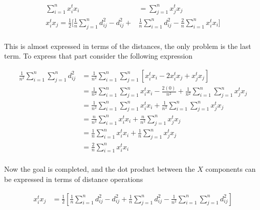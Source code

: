 \documentclass[12pt,journal]{IEEEtran}
\begin{document}
    \begin{equation*}
        \begin{aligned}
            \sum_{i=1}^n x_i^t x_i &= \sum_{j=1}^n x_j^t x_j\\
            x_i^t x_j =
            \frac{1}{2} \Bigg [ \frac{1}{n} \sum_{j=1}^n d_{ij}^2 - d_{ij}^2 + &\frac{1}{n} \sum_{i=1}^n d_{ij}^2 - \frac{2}{n} \sum_{i=1}^n x_i^t x_i \Bigg ]\\
        \end{aligned}
    \end{equation*}

    This is almost expressed in terms of the distances, the only problem is the
    last term. To express that part consider the following expression

    \begin{equation*}
        \begin{aligned}
            \frac{1}{n^2}\sum_{i=1}^n \sum_{j=1}^n d_{ij}^2
            &=
            \frac{1}{n^2}\sum_{i=1}^n \sum_{j=1}^n [x_i^t x_i - 2 x_i^t x_j + x_j^t x_j]\\
            &=
            \frac{1}{n^2}\sum_{i=1}^n \sum_{j=1}^n x_i^t x_i - \frac{2(0)}{n^2} +  \frac{1}{n^2}\sum_{i=1}^n \sum_{j=1}^nx_j^t x_j\\
            &=
            \frac{1}{n^2}\sum_{i=1}^n \sum_{j=1}^n x_i^t x_i +  \frac{1}{n^2}\sum_{i=1}^n \sum_{j=1}^nx_j^t x_j\\
            &=
            \frac{n}{n^2}\sum_{i=1}^n x_i^t x_i +  \frac{n}{n^2}\sum_{j=1}^n x_j^t x_j\\
            &=
            \frac{1}{n}\sum_{i=1}^n x_i^t x_i +  \frac{1}{n}\sum_{j=1}^n x_j^t x_j\\
            &=
            \frac{2}{n}\sum_{i=1}^n x_i^t x_i\\
        \end{aligned}
    \end{equation*}

    Now the goal is completed, and the dot product between the $X$ components
    can be expressed in terms of distance operations

    \begin{equation*}
        \begin{aligned}
            x_i^t x_j
            &=
            \frac{1}{2} \left[ \frac{1}{n} \sum_{i=1}^n d_{ij}^2 - d_{ij}^2 + \frac{1}{n} \sum_{j=1}^n d_{ij}^2 - \frac{1}{n^2}\sum_{i=1}^n \sum_{j=1}^n d_{ij}^2 \right]\\
        \end{aligned}
    \end{equation*}
\end{document}
